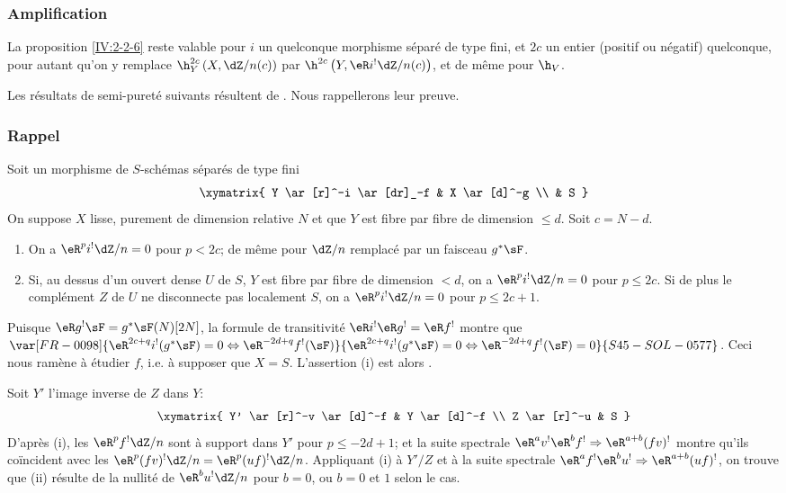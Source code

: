 \subsubsection{Amplification}\label{IV:2-2-7}

La proposition \ref{IV:2-2-6} reste valable pour $i$ un quelconque morphisme 
séparé de type fini, et $2 c$ un entier (positif ou négatif) quelconque, 
pour autant qu'on y remplace $\h_Y^{2 c}\left(X,\dZ/n(c)\right)$ par 
$\h^{2 c}\left(Y,\eR i^!\dZ/n(c)\right)$, et de même pour $\h_V$. 

Les résultats de semi-pureté suivants résultent de 
. Nous rappellerons leur preuve. 





\subsubsection{Rappel}\label{IV:2-2-8}
Soit un morphisme de $S$-schémas séparés de type fini 
\[\xymatrix{
  Y \ar[r]^-i \ar[dr]_-f 
    & X \ar[d]^-g \\
  & S
}\]
On suppose $X$ lisse, purement de dimension relative $N$ et que $Y$ est fibre 
par fibre de dimension $\leqslant d$. Soit $c=N-d$. 
\begin{enumerate}[\indent (i)]
  \item On a $\eR^p i^!\dZ/n=0$ pour $p<2 c$; de même pour $\dZ/n$ remplacé 
    par un faisceau $g^* \sF$.
  \item Si, au dessus d'un ouvert dense $U$ de $S$, $Y$ est fibre par fibre de 
    dimension $<d$, on a $\eR^p i^!\dZ/n=0$ pour $p\leqslant 2 c$. Si de plus le 
    complément $Z$ de $U$ ne disconnecte pas localement $S$, on a 
    $\eR^pi^!\dZ/n=0$ pour $p\leqslant 2 c+1$.
\end{enumerate}

Puisque $\eR g^! \sF=g^*\sF(N)[2N]$, la formule de transitivité 
$\eR i^!\eR g^!=\eR f^!$ montre que 
$\var[FR-0098]{\eR^{2 c+q} i^!(g^*\sF)=0\Leftrightarrow \eR^{-2 d+q}f^!(\sF)}{\eR^{2 c+q} i^!(g^*\sF)=0\Leftrightarrow \eR^{-2 d+q}f^!(\sF)=0}{S45-SOL-0577}$. Ceci nous 
ramène à étudier $f$, i.e. à supposer que $X=S$. L'assertion (i) est 
alors . 

Soit $Y'$ l'image inverse de $Z$ dans $Y$:
\[\xymatrix{
  Y' \ar[r]^-v \ar[d]^-f 
    & Y \ar[d]^-f \\
  Z \ar[r]^-u 
    & S
}\]
D'après (i), les $\eR^p f^! \dZ/n$ sont à support dans $Y'$ pour 
$p\leqslant -2 d+1$; et la suite spectrale 
$\eR^a v^!\eR^b f^! \Rightarrow \eR^{a+b} (f v)^!$ montre qu'ils coïncident avec 
les $\eR^p(f v)^!\dZ/n=\eR^p(u f)^!\dZ/n$. Appliquant (i) à $Y'/Z$ et à la 
suite spectrale $\eR^a f^!\eR^b u^! \Rightarrow \eR^{a+b} (u f)^!$, on trouve que 
(ii) résulte de la nullité de $\eR^b u^! \dZ/n$ pour $b=0$, ou $b=0$ et $1$ 
selon le cas. 





